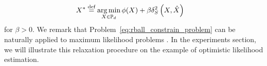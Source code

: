 \documentclass[sn-nature]{sn-jnl}%
\theoremstyle{thmstyleone}%
\theoremstyle{thmstyletwo}%
\theoremstyle{thmstylethree}%
\begin{document}
\begin{equation}\label{eq:rball_constrain_problem}
    \begin{aligned}
        &X^* \stackrel{\text{def}}{=} \operatorname*{arg\,min}_{X \in \mathbb{P}_d} \phi(X) + \beta \delta_S^2\left(X, \hat{X} \right)
    \end{aligned}
\end{equation}
for $\beta>0.$ We remark that Problem~\ref{eq:rball_constrain_problem} can be naturally applied to maximum likelihood problems \citep{Nguyen2019CalculatingOL}. In the experiments section, we will illustrate this relaxation procedure on the example of optimistic likelihood estimation.





\end{document}
